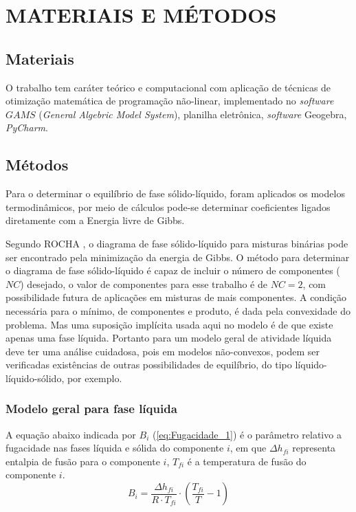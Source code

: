 \chapter{MATERIAIS E MÉTODOS}
\label{Material_metodo}

\section{Materiais}
\hspace{0.5cm} O trabalho tem caráter teórico e computacional com aplicação de técnicas de otimização matemática de programação não-linear, implementado no \textit{software} $GAMS$ (\textit{General Algebric Model System}), planilha eletrônica, \textit{software} Geogebra, \textit{PyCharm}.

\section{Métodos}

\hspace{0.5cm} Para o determinar o equilíbrio de fase sólido-líquido, foram aplicados os modelos termodinâmicos, por meio de cálculos pode-se determinar coeficientes ligados diretamente com a Energia livre de Gibbs.  \cite{Rocha2009a,Costa2007}

Segundo ROCHA \citeyear{Rocha2009a}, o diagrama de fase sólido-líquido para misturas binárias pode ser encontrado pela minimização da energia de Gibbs. O método para determinar o diagrama de fase sólido-líquido é capaz de incluir o número de componentes ($NC$) desejado, o valor de componentes para esse trabalho é de $NC=2$, com possibilidade futura de aplicações em misturas de mais componentes. A condição necessária para o mínimo, de componentes e produto, é dada pela convexidade do problema. Mas uma suposição implícita usada aqui no modelo é de que existe apenas uma fase líquida. Portanto para um modelo geral de atividade líquida deve ter uma análise cuidadosa, pois em modelos não-convexos, podem ser verificadas existências de outras possibilidades de equilíbrio, do tipo líquido-líquido-sólido, por exemplo. 

\subsection{Modelo geral para fase líquida}

\hspace{0.5cm} A equação abaixo indicada por $B_{i}$ (\ref{eq:Fugacidade_1}) é o parâmetro relativo a fugacidade nas fases líquida e sólida do componente $i$, em que $\Delta h_{fi}$ representa entalpia de fusão para o componente $i$, $T_{fi}$ é a temperatura de fusão do componente $i$.
\begin{equation}\label{eq:Fugacidade_1}
B_{i}=\frac{\Delta h_{fi}}{R\cdot T_{fi}}\cdot\left(\frac{T_{fi}}{T}-1\right)
\end{equation}

